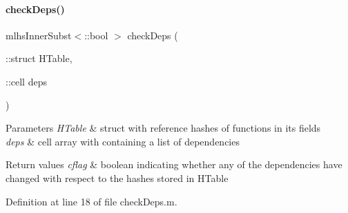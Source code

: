 \paragraph{\texorpdfstring{checkDeps()}{checkDeps()}}
{\footnotesize\ttfamily mlhs\+Inner\+Subst$<$\+::bool $>$ check\+Deps (\begin{DoxyParamCaption}\item[{\+::struct}]{H\+Table,  }\item[{\+::cell}]{deps }\end{DoxyParamCaption})}


\begin{DoxyParams}{Parameters}
{\em H\+Table} & struct with reference hashes of functions in its fields\\
\hline
{\em deps} & cell array with containing a list of dependencies\\
\hline
\end{DoxyParams}

\begin{DoxyRetVals}{Return values}
{\em cflag} & boolean indicating whether any of the dependencies have changed with respect to the hashes stored in H\+Table \\
\hline
\end{DoxyRetVals}


Definition at line 18 of file check\+Deps.\+m.


